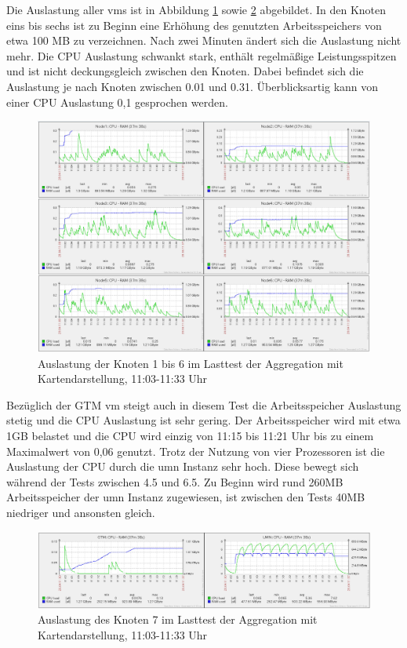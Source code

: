 Die Auslastung aller \Gls{vm}s ist in Abbildung \ref{fig:auslastungTest1UMN} sowie \ref{fig:auslastungTest1UMN_gtm_umn} abgebildet.
In den Knoten eins bis sechs ist zu Beginn eine Erhöhung des genutzten Arbeitsspeichers von etwa 100 MB  zu verzeichnen.
Nach zwei Minuten ändert sich die Auslastung nicht mehr.
Die CPU Auslastung schwankt stark, enthält regelmäßige Leistungsspitzen und ist nicht deckungsgleich zwischen den Knoten.
Dabei befindet sich die Auslastung je nach Knoten zwischen 0.01 und 0.31.
Überblicksartig kann von einer CPU Auslastung 0,1 gesprochen werden.
\begin{figure}[h!]
\centering
\includegraphics[width=\textwidth]{Testergebnisse/umn_aggregation_Testlauf.png}
\caption[Auslastung der Knoten 1 bis 6 im Lasttest der Aggregation mit Kartendarstellung]{Auslastung der Knoten 1 bis 6 im Lasttest der Aggregation mit Kartendarstellung, 11:03-11:33 Uhr}
\label{fig:auslastungTest1UMN}
\end{figure}
Bezüglich der GTM \Gls{vm} steigt auch in diesem Test die Arbeitsspeicher Auslastung stetig und die CPU Auslastung ist sehr gering.
Der Arbeitsspeicher wird mit etwa 1GB belastet und die CPU wird einzig von 11:15 bis 11:21 Uhr bis zu einem Maximalwert von 0,06 genutzt.
Trotz der Nutzung von vier Prozessoren ist die Auslastung der CPU durch die \Gls{umn} Instanz sehr hoch.
Diese bewegt sich während der Tests zwischen 4.5 und 6.5.
Zu Beginn wird rund 260MB Arbeitsspeicher der \Gls{umn} Instanz zugewiesen, ist zwischen den Tests 40MB niedriger und ansonsten gleich.
\begin{figure}[h!]
\centering
\includegraphics[width=\textwidth]{Testergebnisse/umn_aggregation_Testlauf_bild2.png}
\caption[Auslastung des Knoten 7 im Lasttest der Aggregation mit Kartendarstellung]{Auslastung des Knoten 7 im Lasttest der Aggregation mit Kartendarstellung, 11:03-11:33 Uhr}
\label{fig:auslastungTest1UMN_gtm_umn}
\end{figure}



